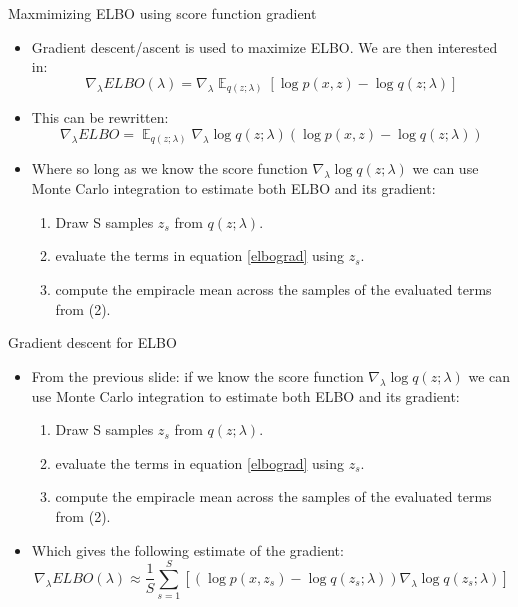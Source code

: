 \documentclass{beamer}
\begin{document}
\begin{frame}{Maxmimizing ELBO using score function gradient}
  \begin{itemize}
  \item Gradient descent/ascent is used to maximize ELBO. We are then interested in:
    \[\nabla_\lambda ELBO(\lambda) = \nabla_\lambda \mathop{\mathbb{E}}_{q(z ; \lambda)} \left[\log p(x, z) - \log q(z ; \lambda) \right]\]
  \item This can be rewritten:
    \begin{equation}
      \label{elbograd}
      \nabla_\lambda ELBO =  \mathop{\mathbb{E}}_{q(z ; \lambda)} \nabla_\lambda \log q(z ; \lambda) \left(\log p(x, z) - \log q(z ; \lambda) \right)
    \end{equation}
  \item Where so long as we know the score function $\nabla_\lambda \log q(z ; \lambda)$ we can use Monte Carlo integration to estimate both ELBO and its gradient:
    \begin{enumerate}
    \item Draw S samples $z_s$ from  $q(z ; \lambda)$.
    \item evaluate the terms in equation \ref{elbograd} using $z_s$.
    \item compute the empiracle mean across the samples of the evaluated terms from (2).
    \end{enumerate}
  \end{itemize}
\end{frame}

\begin{frame}{Gradient descent for ELBO}
  \begin{itemize}
  \item From the previous slide: if we know the score function $\nabla_\lambda \log q(z ; \lambda)$ we can use Monte Carlo integration to estimate both ELBO and its gradient:
    \begin{enumerate}
    \item Draw S samples $z_s$ from  $q(z ; \lambda)$.
    \item evaluate the terms in equation \ref{elbograd} using $z_s$.
    \item compute the empiracle mean across the samples of the evaluated terms from (2).
    \end{enumerate}
  \item  Which gives the following estimate of the gradient:
      \[\nabla_\lambda ELBO(\lambda) \approx \frac{1}{S} \sum_{s=1}^{S} \left[ \left( \log p(x, z_s) - \log q(z_s; \lambda)\right) \nabla_\lambda \log q(z_s; \lambda) \right]\]
  \end{itemize}
\end{frame}
\end{document}
